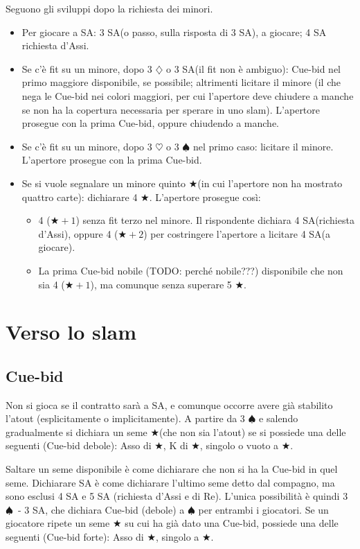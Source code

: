 \documentclass[a4paper,10pt]{article}
\renewcommand{\d}{$\diamondsuit$\xspace}
\newcommand{\h}{$\heartsuit$\xspace}
\newcommand{\s}{$\spadesuit$\xspace}
\renewcommand{\j}{$\bigstar$\xspace}
\newcommand{\sa}{SA\xspace}
\begin{document}
\noindent Seguono gli sviluppi dopo la richiesta dei minori.
\begin{itemize}
 \item Per giocare a \sa: 3 \sa (o passo, sulla risposta di 3 \sa), a giocare; 4 \sa richiesta d'Assi.
 \item Se c'è fit su un minore, dopo 3 \d o 3 \sa (il fit non è ambiguo): Cue-bid nel primo maggiore disponibile, se possibile; altrimenti licitare il minore (il che nega le Cue-bid nei colori maggiori, per cui l'apertore deve chiudere a manche se non ha la copertura necessaria per sperare in uno slam).
 L'apertore prosegue con la prima Cue-bid, oppure chiudendo a manche.
 \item Se c'è fit su un minore, dopo 3 \h o 3 \s nel primo caso: licitare il minore.
 L'apertore prosegue con la prima Cue-bid.
 \item Se si vuole segnalare un minore quinto \j (in cui l'apertore non ha mostrato quattro carte): dichiarare 4 \j.
 L'apertore prosegue così:
 \begin{itemize}
  \item 4 ($\bigstar+1$) senza fit terzo nel minore. Il rispondente dichiara 4 \sa (richiesta d'Assi), oppure 4 ($\bigstar+2$) per costringere l'apertore a licitare 4 \sa (a giocare).
  \item La prima Cue-bid nobile (TODO: perché nobile???) disponibile che non sia 4 ($\bigstar+1$), ma comunque senza superare 5 \j.
  
 \end{itemize}
\end{itemize}


\pagebreak

\section{Verso lo slam}

\subsection{Cue-bid}

Non si gioca se il contratto sarà a SA, e comunque occorre avere già stabilito l'atout (esplicitamente o implicitamente). A partire da 3 \s e salendo gradualmente si dichiara un seme \j (che non sia l'atout) se si possiede una delle seguenti (Cue-bid debole): Asso di \j, K di \j, singolo o vuoto a \j.

Saltare un seme disponibile è come dichiarare che non si ha la Cue-bid in quel seme. Dichiarare SA è come dichiarare l'ultimo seme detto dal compagno, ma sono esclusi 4 SA e 5 SA (richiesta d'Assi e di Re). L'unica possibilità è quindi 3 \s\ - 3 SA, che dichiara Cue-bid (debole) a \s per entrambi i giocatori. Se un giocatore ripete un seme \j su cui ha già dato una Cue-bid, possiede una delle seguenti (Cue-bid forte): Asso di \j, singolo a \j.
\end{document}
